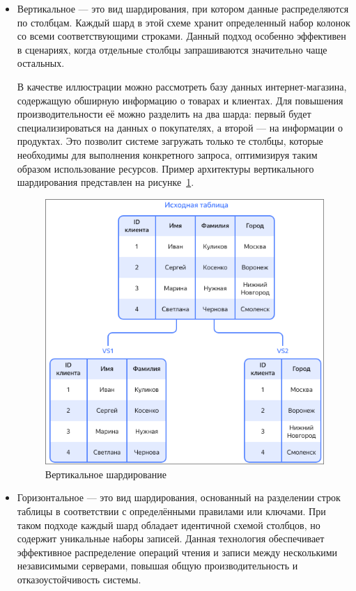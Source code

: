 \begin{itemize}
    \item Вертикальное — это вид шардирования, при котором
    данные распределяются по столбцам. Каждый шард в этой схеме хранит
    определенный набор колонок со всеми соответствующими строками. Данный
    подход особенно эффективен в сценариях, когда отдельные столбцы
    запрашиваются значительно чаще остальных.

    В качестве иллюстрации можно рассмотреть базу данных интернет-магазина,
    содержащую обширную информацию о товарах и клиентах. Для повышения
    производительности её можно разделить на два шарда: первый будет
    специализироваться на данных о покупателях, а второй — на информации о
    продуктах. Это позволит системе загружать только те столбцы, которые
    необходимы для выполнения конкретного запроса, оптимизируя таким образом
    использование ресурсов. Пример архитектуры вертикального шардирования
    представлен на рисунке~\ref{fig:fig01}.

\begin{figure}
  \centering
  \includegraphics[scale=0.5]{inc/vertical-sharding.png}
  \caption{Вертикальное шардирование}
  \label{fig:fig01}
\end{figure}
    \item Горизонтальное — это вид шардирования, основанный на разделении строк
    таблицы в соответствии с определёнными правилами или ключами. При таком
    подходе каждый шард обладает идентичной схемой столбцов, но содержит
    уникальные наборы записей. Данная технология обеспечивает эффективное
    распределение операций чтения и записи между несколькими независимыми
    серверами, повышая общую производительность и отказоустойчивость системы.


\end{itemize}
